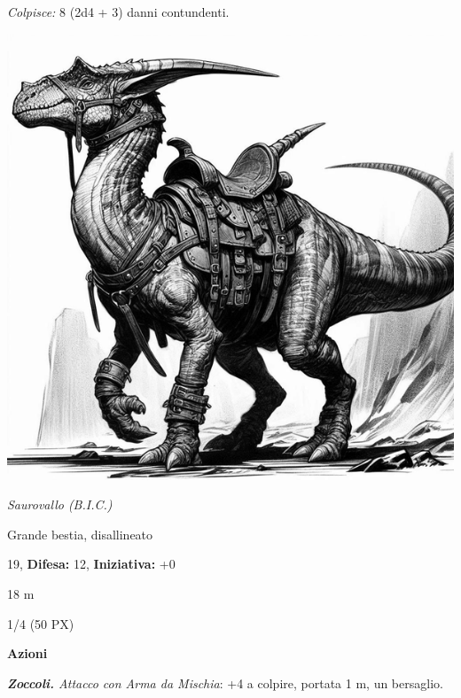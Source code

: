 \begin{multicols}{2}
{\emph{Colpisce:} 8 (2d4 + 3) danni contundenti.

\begin{center}
	\includegraphics[width=0.85\linewidth]{immagini/saurovallo2-ai.png}

	\emph{Saurovallo (B.I.C.)}
\end{center}

\begin{description}[noitemsep, topsep=0pt, parsep=0pt, partopsep=0pt, leftmargin=0cm, labelwidth=2.2cm]
    \item[\textbf{Taglia/Tipo:}] Grande bestia, disallineato
    \item[\textbf{Caratt.:}] 
    \item[\textbf{Punti Ferita:}] 19,  \textbf{Difesa:} 12,  \textbf{Iniziativa:} +0
    \item[\textbf{Tiri Salvez.:}] 
    \item[\textbf{Movimento:}] 18 m
    \item[\textbf{Sfida:}] 1/4 (50 PX)\smallskip
\end{description}

\textbf{Azioni}

\emph{\textbf{Zoccoli.} Attacco con Arma da Mischia}: +4 a colpire, portata 1 m, un bersaglio.

}
\end{multicols}
